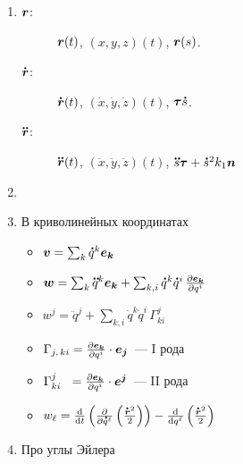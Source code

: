 \documentclass[draft,landscape,timbord]{notes}
\begin{document}
\begin{multicols*}{3}
\begin{enumerate}
  \item 
    \begin{description}
      \item[$\v r$:] $\v r(t)$, $(x,y,z)(t)$, $\v r(s)$.
      \item[$\dot{\v r}$:] $\dot{\v r}(t)$, $(\dot x,\dot y,\dot z)(t)$, $\v\tau \dot s$.
      \item[$\ddot{\v r}$:] $\ddot{\v r}(t)$, $(\ddot x,\ddot y,\ddot z)(t)$,
        $\ddot s \v \tau + \dot s^2 k_1 \v n$
    \end{description}
  \item \quest
  \item В криволинейных координатах
    \begin{itemize}[$\triangleright$]
      \item $\v v = \sum_k \dot q^k \v {e_k}$
      \item $\v w = \sum_k \ddot q^k \v {e_k} + \sum_{k,i} \dot q^k \dot q^i \, \pder{\v{e_k}}{q^i}$
      \item ${w^j} = \ddot q^j + \sum_{k,i} \dot q^k \dot q^i \, \Gamma_{ki}^j$
      \item $ \Gamma_{j,\,ki} = \pder{\v{e_k}}{q^i}\cdot \v{e_j}$~--- I рода
      \item $ \Gamma_{ki}^j \;\,\,= \pder{\v{e_k}}{q^i}\cdot \v{e^j}$~--- II рода
      \item $w_\ell = 
        \fder{}{t} \left(\pder{}{\dot q^\ell}\left(\frac{\dot{\v r}^2}{2}\right)\right) 
        - \fder{}{q^\ell} \left(\frac{\dot{\v r}^2}{2}\right)$
    \end{itemize}
  \item Про углы Эйлера \\

\end{enumerate}
\end{multicols*}
\end{document}
